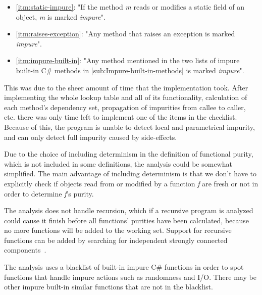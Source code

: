 \documentclass[a4paper,12pt]{article}
\begin{document}
\begin{itemize}
  \item \autoref{itm:static-impure}: "If the method \textit{m} reads or modifies a static field of an object, \textit{m} is marked \textit{impure}".
  \item \autoref{itm:raises-exception}: "Any method that raises an exception is marked \textit{impure}".
  \item \autoref{itm:impure-built-in}: "Any method mentioned in the two lists of impure built-in C\# methods in \autoref{sub:Impure-built-in-methods} is marked \textit{impure}".
\end{itemize}

This was due to the sheer amount of time that the implementation took. After implementing the whole lookup table and all of its functionality, calculation of each method's dependency set, propagation of impurities from callee to caller, etc. there was only time left to implement one of the items in the checklist. Because of this, the program is unable to detect local and parametrical impurity, and can only detect full impurity caused by side-effects.

Due to the choice of including determinism in the definition of functional purity, which is not included in some definitions, the analysis could be somewhat simplified. The main advantage of including determinism is that we don't have to explicitly check if objects read from or modified by a function \textit{f} are fresh or not in order to determine \textit{f}'s purity.


The analysis does not handle recursion, which if a recursive program is analyzed could cause it finish before all functions' purities have been calculated, because no more functions will be added to the working set. Support for recursive functions can be added by searching for independent strongly connected components~\cite{pitidis2010purity}.


The analysis uses a blacklist of built-in impure C\# functions in order to spot functions that handle impure actions such as randomness and I/O. There may be other impure built-in similar functions that are not in the blacklist.
\end{document}
